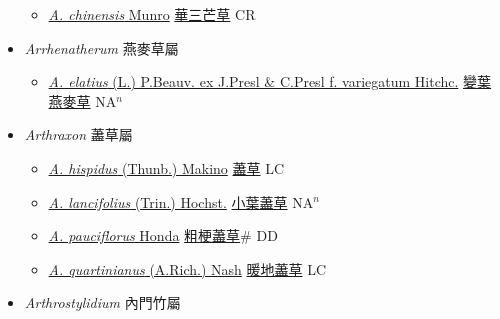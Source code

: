 \begin{itemize}
  \begin{itemize}
        \item[] \href{http://www.theplantlist.org/tpl1.1/search?q=Aristida+chinensis}{\textit{A. chinensis} Munro}   \href{\detokenize{http://taibnet.sinica.edu.tw/chi/taibnet_species_list.php?T2=華三芒草&T2_new_value=true&fr=y}}{華三芒草} CR
  \end{itemize}
 \item[] \textit{Arrhenatherum} 燕麥草屬
                    
  \begin{itemize}
        \item[] \href{http://www.theplantlist.org/tpl1.1/search?q=Arrhenatherum+elatius}{\textit{A. elatius} (L.) P.Beauv. ex J.Presl \& C.Presl f. variegatum Hitchc.}   \href{\detokenize{http://taibnet.sinica.edu.tw/chi/taibnet_species_list.php?T2=變葉燕麥草&T2_new_value=true&fr=y}}{變葉燕麥草} NA$^n$
  \end{itemize}
 \item[] \textit{Arthraxon} 藎草屬
                    
  \begin{itemize}
        \item[] \href{http://www.theplantlist.org/tpl1.1/search?q=Arthraxon+hispidus}{\textit{A. hispidus} (Thunb.) Makino}   \href{\detokenize{http://taibnet.sinica.edu.tw/chi/taibnet_species_list.php?T2=藎草&T2_new_value=true&fr=y}}{藎草} LC
        \item[] \href{http://www.theplantlist.org/tpl1.1/search?q=Arthraxon+lancifolius}{\textit{A. lancifolius} (Trin.) Hochst.}   \href{\detokenize{http://taibnet.sinica.edu.tw/chi/taibnet_species_list.php?T2=小葉藎草&T2_new_value=true&fr=y}}{小葉藎草} NA$^n$
        \item[] \href{http://www.theplantlist.org/tpl1.1/search?q=Arthraxon+pauciflorus}{\textit{A. pauciflorus} Honda}   \href{\detokenize{http://taibnet.sinica.edu.tw/chi/taibnet_species_list.php?T2=粗梗藎草&T2_new_value=true&fr=y}}{粗梗藎草}\# DD
        \item[] \href{http://www.theplantlist.org/tpl1.1/search?q=Arthraxon+quartinianus}{\textit{A. quartinianus} (A.Rich.) Nash}   \href{\detokenize{http://taibnet.sinica.edu.tw/chi/taibnet_species_list.php?T2=暖地藎草&T2_new_value=true&fr=y}}{暖地藎草} LC
  \end{itemize}
 \item[] \textit{Arthrostylidium} 內門竹屬
                    

\end{itemize}
